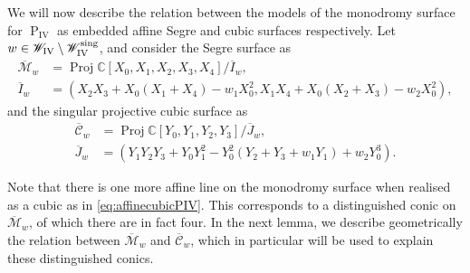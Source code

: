 \documentclass[a4paper,reqno]{amsart}
\numberwithin{equation}{section}
\newcommand{\C}{\mathbb{C}}
\newcommand{\pain}[1]{\operatorname{P}_{\mathrm{#1}}}
\numberwithin{equation}{section}
\begin{document}
    We will now describe the relation between the models of the monodromy surface for $\pain{IV}$ as embedded affine Segre and cubic surfaces respectively.
    Let $w \in \mathscr{W}_{\rm{IV}}\setminus \mathscr{W}_{\rm{IV}}^{\operatorname{sing}}$, and consider the Segre surface as 
    \begin{equation*}
        \begin{aligned}
            \overline{\mathcal{M}}_w &= \operatorname{Proj} \C[X_0,X_1,X_2,X_3,X_4]/\overline{I}_w, \\
            \overline{I}_w&=(X_2 X_3+X_0(X_1+X_4)-w_1 X_0^2, X_1X_4+X_0(X_2+X_3)-w_2 X_0^2),
        \end{aligned}
    \end{equation*}
    and the singular projective cubic surface as 
    \begin{equation*}
        \begin{aligned}
            \overline{\mathcal{C}}_w &= \operatorname{Proj} \C[Y_0,Y_1,Y_2,Y_3]/\overline{J}_w, \\
            \overline{J}_w &= \left( Y_1 Y_2 Y_3 + Y_0Y_1^2 - Y_0^2(Y_2 +Y_3 + w_1 Y_1)+w_2Y_0^3 \right).
        \end{aligned}
    \end{equation*}

    Note that there is one more affine line on the monodromy surface when realised as a cubic as in \eqref{eq:affinecubicPIV}.
    This corresponds to a distinguished conic on  $\overline{\mathcal{M}}_w$, of which there are in fact four. 
    In the next lemma, we describe geometrically the relation between $\overline{\mathcal{M}}_w$ and $\overline{\mathcal{C}}_w$, which in particular will be used to explain these distinguished conics.

    
\end{document}
